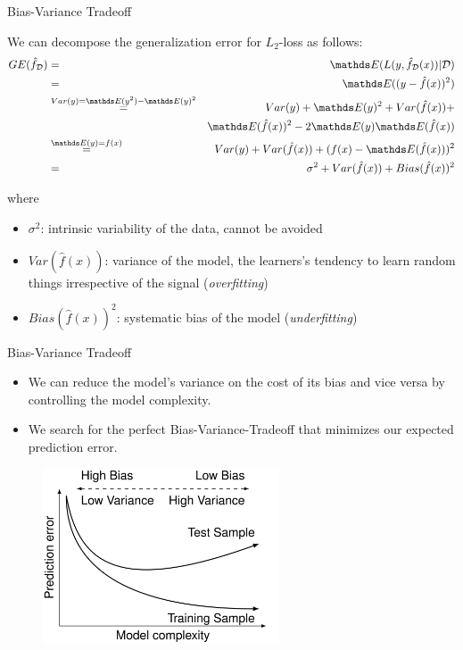 \documentclass[11pt,compress,t,notes=noshow, xcolor=table]{beamer}
\begin{document}
\begin{vbframe}{Bias-Variance Tradeoff}

We can decompose the generalization error for $L_2$-loss as follows:
\begin{eqnarray*}
  \GED &=& \E( L(y, \fhD(x)) | \D) \\
  &=& \E((y-\hat{f}(x))^2) \\
  &\overset{Var(y)=\E(y^2)-\E(y)^2}{=}& Var(y) + \E(y)^2 + Var(\hat f(x)) + \\
  &&\E(\hat f(x))^2 - 2 \E(y) \E(\hat f(x)) \\
  &\overset{\E(y) = f(x)}{=}& Var(y) + Var(\hat f(x)) + (f(x) - \E(\hat f(x)))^2\\
  &=& \sigma^2 + Var(\hat{f}(x)) + Bias(\hat{f}(x))^2
\end{eqnarray*}

where

\begin{itemize}
  \item $\sigma^2$: intrinsic variability of the data, cannot be avoided
  \item $Var(\hat f(x))$: variance of the model, the learners's tendency to learn random things irrespective of the signal (\textit{overfitting})
  \item $Bias(\hat f(x))^2$: systematic bias of the model (\textit{underfitting})
\end{itemize}

\end{vbframe}


\begin{vbframe}{Bias-Variance Tradeoff}

  \begin{itemize}
    \item We can reduce the model's variance on the cost of its bias and vice versa by controlling the model complexity.
    \item We search for the perfect Bias-Variance-Tradeoff that minimizes our expected prediction error.
\end{itemize}

\begin{figure}
    \centering
    \includegraphics[width=7cm]{figure_man/bias_variance.png}
\end{figure}

\end{vbframe}


\endlecture
\end{document}
